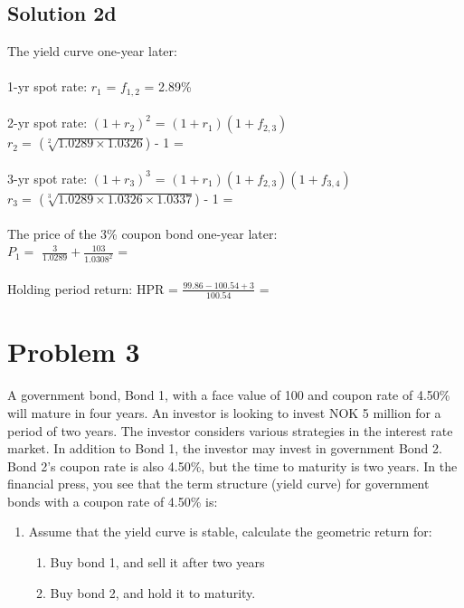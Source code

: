 \documentclass[12]{article}
\begin{document}
\subsection*{Solution 2d}
The yield curve one-year later:\\
\\
1-yr spot rate: $ r_1$ = $ f_{1,2}$ = 2.89\%\\
\\
2-yr spot rate: $(1 + r_2)^2$ = $(1+r_1) (1 + f_{2,3})$\\
$r_2 =$ ($\sqrt[2]{1.0289 \times 1.0326}$) - 1 = \\
\\
3-yr spot rate: $(1 + r_3)^3$ = $(1+r_1) (1 + f_{2,3}) (1 + f_{3,4})$\\
$r_3 =$ ($\sqrt[3]{1.0289 \times 1.0326 \times 1.0337}$) - 1 = \\
\\
The price of the 3\% coupon bond one-year later:\\
$P_1 =$ {\Large $\frac{3}{1.0289} + \frac{103}{1.0308^2}$} = \\
\\
Holding period return: HPR = {\Large $\frac{99.86 - 100.54 + 3}{100.54}$} = 



\color{black}
\section*{Problem 3}
A government bond, Bond 1, with a face value of 100 and coupon rate of 4.50\% will mature in four years. An investor is looking to invest NOK 5 million for a period of two years. The investor considers various strategies in the interest rate market. In addition to Bond 1, the investor may invest in government Bond 2. Bond 2’s coupon rate is also 4.50\%, but the time to maturity is two years. In the financial press, you see that the term structure (yield curve) for government bonds with a coupon rate of 4.50\% is:
\begin{table}[H]
\centering
{}
\label{tab:my-table}
\end{table}
\begin{enumerate}
    \item[a] Assume that the yield curve is stable, calculate the geometric return for:
    \begin{enumerate}
        \item[i)] Buy bond 1, and sell it after two years
        \item[ii)] Buy bond 2, and hold it to maturity.
    \end{enumerate}
    
\end{enumerate}
\end{document}
